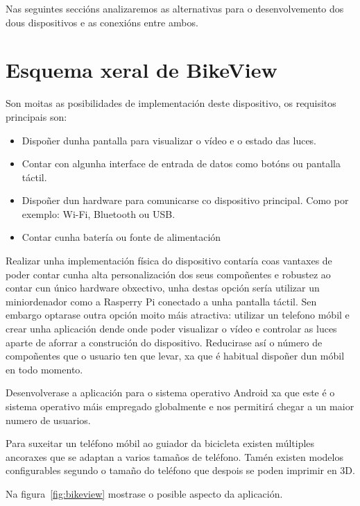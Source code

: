 Nas seguintes seccións analizaremos as alternativas para o desenvolvemento dos dous dispositivos e as conexións entre ambos.

\section{Esquema xeral de BikeView}

Son moitas as posibilidades de implementación deste dispositivo, os requisitos principais son:
\begin{itemize}
    \item Dispoñer dunha pantalla para visualizar o vídeo e o estado das luces.
    \item Contar con algunha interface de entrada de datos como botóns ou pantalla táctil.
    \item Dispoñer dun hardware para comunicarse co dispositivo principal. Como por exemplo: Wi-Fi, Bluetooth ou USB.
    \item Contar cunha batería ou fonte de alimentación
\end{itemize}

Realizar unha implementación física do dispositivo contaría coas vantaxes de poder contar cunha alta personalización dos seus compoñentes e robustez ao contar cun único hardware obxectivo, unha destas opción sería utilizar un miniordenador como a Rasperry Pi conectado a unha pantalla táctil. Sen embargo optarase outra opción moito máis atractiva: utilizar un telefono móbil e crear unha aplicación dende onde poder visualizar o vídeo e controlar as luces aparte de aforrar a construción do dispositivo. Reducirase así o número de compoñentes que o usuario ten que levar, xa que é habitual dispoñer dun móbil en todo momento.

Desenvolverase a aplicación para o sistema operativo Android xa que este é o sistema operativo máis empregado globalmente e nos permitirá chegar a un maior numero de usuarios.

Para suxeitar un teléfono móbil ao guiador da bicicleta existen múltiples ancoraxes que se adaptan a varios tamaños de teléfono. Tamén existen modelos configurables segundo o tamaño do teléfono que despois se poden imprimir en 3D.

Na figura~\ref{fig:bikeview} mostrase o posible aspecto da aplicación.

